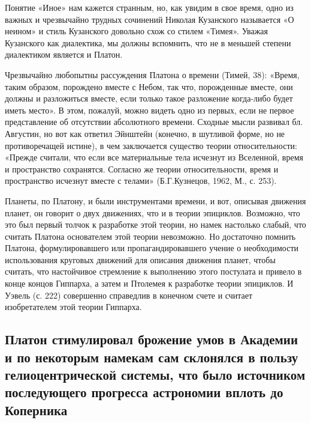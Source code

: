Понятие  «Иное» нам  кажется странным,  но, как  увидим в  свое время,
одно  из важных  и  чрезвычайно трудных  сочинений Николая  Кузанского
называется  «О неином»  и  стиль Кузанского  довольно  схож со  стилем
«Тимея». Уважая Кузанского как диалектика, мы должны вспомнить, что не
в меньшей степени диалектиком является и Платон.

Чрезвычайно  любопытны  рассуждения  Платона о  времени  (Тимей,  38):
«Время, таким образом, порождено вместе  с Небом, так что, порожденные
вместе, они должны и разложиться  вместе, если только такое разложение
когда-либо  будет иметь  место». В  этом, пожалуй,  можно видеть  одно
из  первых, если  не  первое представление  об отсутствии  абсолютного
времени.  Сходные мысли  развивал  бл. Августин,  но  вот как  ответил
Эйнштейн (конечно, в  шутливой форме, но не  противоречащей истине), в
чем заключается существо теории  относительности: «Прежде считали, что
если все материальные тела исчезнут из Вселенной, время и пространство
сохранятся. Согласно  же теории относительности, время  и пространство
исчезнут вместе с телами» (Б.Г.Кузнецов, 1962, М., с. 253).

Планеты, по  Платону, и  были инструментами  времени, и  вот, описывая
движения  планет,  он  говорит  о  двух  движениях,  что  и  в  теории
эпициклов.  Возможно,   что  это   был  первый  толчок   к  разработке
этой  теории,   но  намек   настолько  слабый,  что   считать  Платона
основателем  этой теории  невозможно. Но  достаточно помнить  Платона,
формулировавшего  или   пропагандировавшего  учение   о  необходимости
использования круговых  движений для  описания движения  планет, чтобы
считать,  что настойчивое  стремление к  выполнению этого  постулата и
привело  в конце  концов Гиппарха,  а  затем и  Птолемея к  разработке
теории эпициклов. И  Уэвель (с. 222) совершенно  справедлив в конечном
счете и считает изобретателем этой теории Гиппарха.

\subsection{Платон  стимулировал   брожение  умов  в  Академии   и  по
некоторым намекам  сам склонялся  в пользу  гелиоцентрической системы,
что  было  источником  последующего  прогресса  астрономии  вплоть  до
Коперника}

